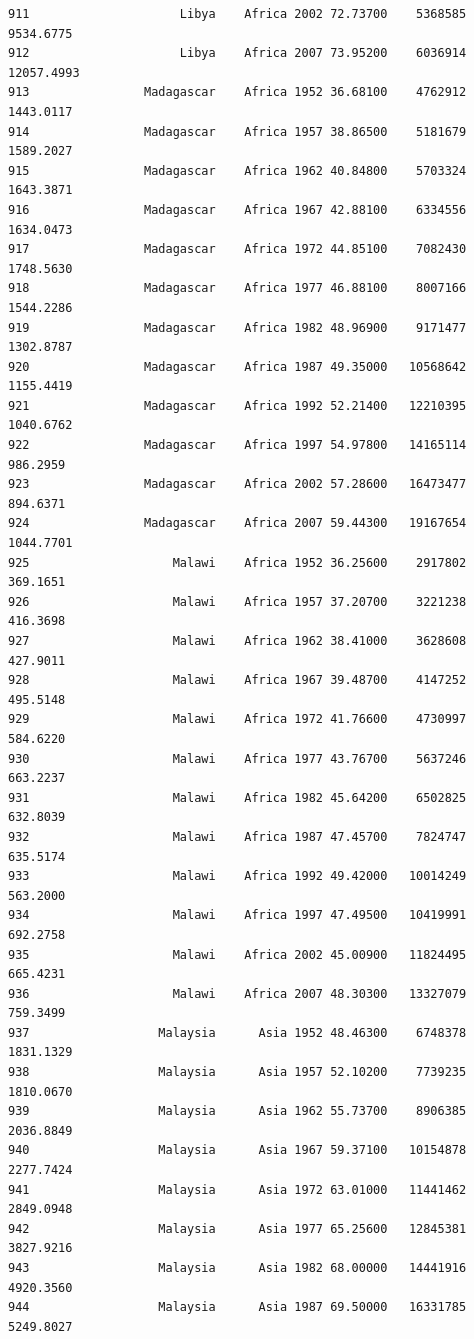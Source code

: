 \documentclass[
  letterpaper,
  DIV=11,
  numbers=noendperiod]{scrreprt}
\begin{document}
\begin{verbatim}
911                     Libya    Africa 2002 72.73700    5368585   9534.6775
912                     Libya    Africa 2007 73.95200    6036914  12057.4993
913                Madagascar    Africa 1952 36.68100    4762912   1443.0117
914                Madagascar    Africa 1957 38.86500    5181679   1589.2027
915                Madagascar    Africa 1962 40.84800    5703324   1643.3871
916                Madagascar    Africa 1967 42.88100    6334556   1634.0473
917                Madagascar    Africa 1972 44.85100    7082430   1748.5630
918                Madagascar    Africa 1977 46.88100    8007166   1544.2286
919                Madagascar    Africa 1982 48.96900    9171477   1302.8787
920                Madagascar    Africa 1987 49.35000   10568642   1155.4419
921                Madagascar    Africa 1992 52.21400   12210395   1040.6762
922                Madagascar    Africa 1997 54.97800   14165114    986.2959
923                Madagascar    Africa 2002 57.28600   16473477    894.6371
924                Madagascar    Africa 2007 59.44300   19167654   1044.7701
925                    Malawi    Africa 1952 36.25600    2917802    369.1651
926                    Malawi    Africa 1957 37.20700    3221238    416.3698
927                    Malawi    Africa 1962 38.41000    3628608    427.9011
928                    Malawi    Africa 1967 39.48700    4147252    495.5148
929                    Malawi    Africa 1972 41.76600    4730997    584.6220
930                    Malawi    Africa 1977 43.76700    5637246    663.2237
931                    Malawi    Africa 1982 45.64200    6502825    632.8039
932                    Malawi    Africa 1987 47.45700    7824747    635.5174
933                    Malawi    Africa 1992 49.42000   10014249    563.2000
934                    Malawi    Africa 1997 47.49500   10419991    692.2758
935                    Malawi    Africa 2002 45.00900   11824495    665.4231
936                    Malawi    Africa 2007 48.30300   13327079    759.3499
937                  Malaysia      Asia 1952 48.46300    6748378   1831.1329
938                  Malaysia      Asia 1957 52.10200    7739235   1810.0670
939                  Malaysia      Asia 1962 55.73700    8906385   2036.8849
940                  Malaysia      Asia 1967 59.37100   10154878   2277.7424
941                  Malaysia      Asia 1972 63.01000   11441462   2849.0948
942                  Malaysia      Asia 1977 65.25600   12845381   3827.9216
943                  Malaysia      Asia 1982 68.00000   14441916   4920.3560
944                  Malaysia      Asia 1987 69.50000   16331785   5249.8027

\end{verbatim}
\end{document}
